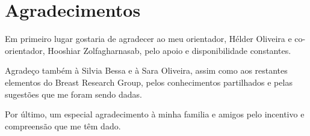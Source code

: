 \chapter*{Agradecimentos}

Em primeiro lugar gostaria de agradecer ao meu orientador, Hélder Oliveira e co-orientador, Hooshiar Zolfagharnasab, pelo apoio e disponibilidade constantes.

Agradeço também à Silvia Bessa e à Sara Oliveira, assim como aos restantes elementos do Breast Research Group, pelos conhecimentos partilhados e pelas sugestões que me foram sendo dadas.

Por último, um especial agradecimento à minha familia e amigos pelo incentivo e compreensão que me têm dado.

\vspace{10mm}
